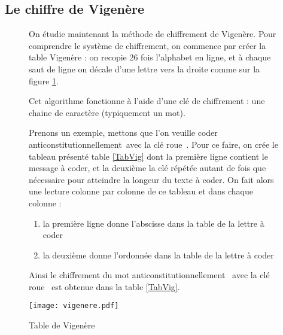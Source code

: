 







\subsection{Le chiffre de Vigenère}

\begin{figure}[!htb]
\begin{minipage}{0.5\textwidth}
On étudie maintenant la méthode de chiffrement de Vigenère. Pour comprendre le système de chiffrement, on commence par créer la table  Vigenère : on recopie $26$ fois l'alphabet en ligne, et à chaque saut de ligne on décale d'une lettre vers la droite comme sur la figure \ref{fig:vigenere}.

Cet algorithme fonctionne à l'aide d'une clé de chiffrement : une chaine de caractère (typiquement un mot).

Prenons un exemple, mettons que l'on veuille coder \og anticonstitutionnellement\fg~avec la clé \og roue\fg~. Pour ce faire, on crée le tableau présenté table \ref{TabVig} dont la première ligne contient le message à coder, et la deuxième la clé répétée autant de fois que nécessaire pour atteindre la longeur du texte à coder. On fait alors une lecture colonne par colonne de ce tableau et dans chaque colonne :
\begin{enumerate}
\item la première ligne donne l'abscisse dans la table de la lettre à coder
\item la deuxième donne l'ordonnée dans la table de la lettre à coder
\end{enumerate}
Ainsi le chiffrement du mot \og anticonstitutionnellement\fg~ avec la clé \og roue\fg~ est obtenue dans la table \ref{TabVig}.
\end{minipage}
\begin{minipage}{0.5\textwidth}
	\centering
		\texttt{[image: vigenere.pdf]}
	\caption{Table de Vigenère}
	\label{fig:vigenere}
\end{minipage}
\end{figure}




